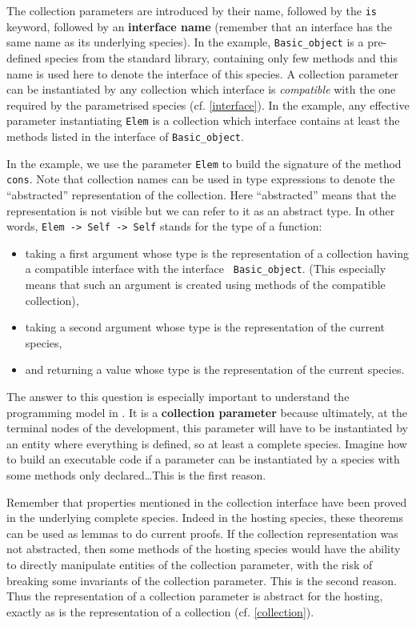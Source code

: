 The collection parameters are introduced by their name, followed by the {\tt is}
keyword, followed by an {\bf interface name} (remember that an interface has
the same name as its underlying species). In the example, {\tt Basic\_object}
is a pre-defined species from the standard library, containing only few
methods and this name is used here to denote the interface of this species.
A collection parameter can be instantiated by any collection which interface
is {\em compatible} with the one required by
the parametrised species (cf. \ref{interface}). In the example, any effective
parameter instantiating {\tt Elem} is a collection which interface contains
at least the methods listed in the interface of {\tt Basic\_object}.

\smallskip
In the example, we use the parameter {\tt Elem} to build the signature
of the method {\tt cons}. Note that collection names can be used
in type expressions to denote the ``abstracted'' representation of the
collection. Here ``abstracted'' means that the
representation is not visible but we can refer to it
as an abstract type. In other words, {\tt Elem -> Self -> Self}
stands for the type of a function:
\begin{itemize}
\item taking a first argument whose type is the representation  of a
  collection having a compatible interface with the interface {\tt
    Basic\_object}. (This especially means that such an argument is
  created using methods of the compatible collection),
  \item taking a second argument whose type is the representation of
    the current species,
  \item and returning a value whose type is the representation  of the
    current species.
\end{itemize}


The answer to this question is especially important to
understand the programming model in {\focal}. It is a {\bf collection
parameter} because ultimately, at the terminal nodes of the
development, this parameter will have to be instantiated by an entity
where everything is defined, so at least a complete species. Imagine
how to build an executable code if a parameter can be instantiated by
a species with some methods only declared\ldots This is the first
reason.

Remember that properties mentioned in the collection interface have
been proved in the underlying complete species. Indeed in the hosting
species, these theorems can be used as lemmas to do current proofs. If
the collection representation was not abstracted, then some methods of
the hosting species would have the ability to directly manipulate
entities of the collection parameter, with the risk of breaking some
invariants of the collection parameter.  This is the second reason.
Thus the representation of a collection parameter is abstract for the
hosting, exactly as is the representation of a collection (cf.
\ref{collection}).


